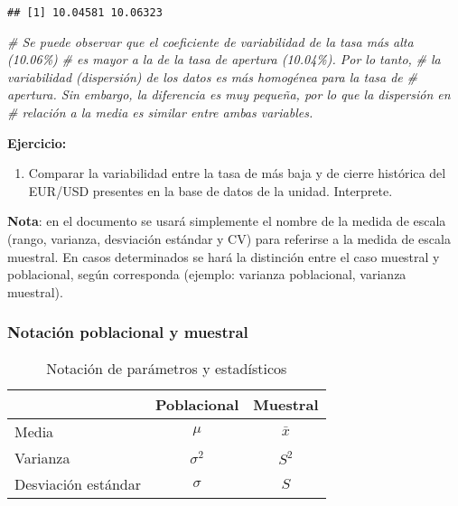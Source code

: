 \documentclass[
]{book}
\newenvironment{Shaded}{\begin{snugshade}}{\end{snugshade}}
\newcommand{\CommentTok}[1]{\textcolor[rgb]{0.56,0.35,0.01}{\textit{#1}}}
\providecommand{\tightlist}{%
  \setlength{\itemsep}{0pt}\setlength{\parskip}{0pt}}
\begin{document}
\begin{verbatim}
## [1] 10.04581 10.06323
\end{verbatim}

\begin{Shaded}
\begin{Highlighting}[]
\CommentTok{\# Se puede observar que el coeficiente de variabilidad de la tasa más alta (10.06\%)}
\CommentTok{\# es mayor a la de la tasa de apertura (10.04\%). Por lo tanto, }
\CommentTok{\# la variabilidad (dispersión) de los datos es más homogénea para la tasa de}
\CommentTok{\# apertura. Sin embargo, la diferencia es muy pequeña, por lo que la dispersión en }
\CommentTok{\# relación a la media es similar entre ambas variables.}
\end{Highlighting}
\end{Shaded}

\textbf{Ejercicio:}

\begin{enumerate}
\def\labelenumi{\arabic{enumi}.}
\tightlist
\item
  Comparar la variabilidad entre la tasa de más baja y de cierre histórica del EUR/USD presentes en la base de datos de la unidad. Interprete.
\end{enumerate}

\textbf{Nota}: en el documento se usará simplemente el nombre de la medida de escala (rango, varianza, desviación estándar y CV) para referirse a la medida de escala muestral. En casos determinados se hará la distinción entre el caso muestral y poblacional, según corresponda (ejemplo: varianza poblacional, varianza muestral).

\hypertarget{notaciuxf3n-poblacional-y-muestral}{%
\subsubsection*{Notación poblacional y muestral}\label{notaciuxf3n-poblacional-y-muestral}}

\begin{table}

\caption{\label{tab:notacion}Notación de parámetros y estadísticos}
\centering
\begin{tabular}[t]{lcc}
\toprule
  & Poblacional & Muestral\\
\midrule
Media & $\mu$ & $\bar{x}$\\
Varianza & $\sigma^2$ & $S^2$\\
Desviación estándar & $\sigma$ & $S$\\
\bottomrule
\end{tabular}
\end{table}
\end{document}
